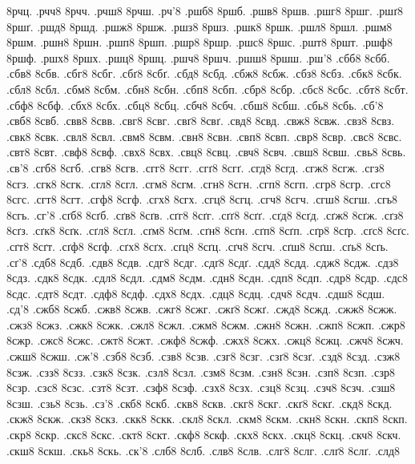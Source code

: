{8рчц.
.рчч8
8рчч.
.рчш8
8рчш.
.рч'8
.ршб8
8ршб.
.ршв8
8ршв.
.ршг8
8ршг.
.ршґ8
8ршґ.
.ршд8
8ршд.
.ршж8
8ршж.
.ршз8
8ршз.
.ршк8
8ршк.
.ршл8
8ршл.
.ршм8
8ршм.
.ршн8
8ршн.
.ршп8
8ршп.
.ршр8
8ршр.
.ршс8
8ршс.
.ршт8
8ршт.
.ршф8
8ршф.
.ршх8
8ршх.
.ршц8
8ршц.
.ршч8
8ршч.
.ршш8
8ршш.
.рш'8
.сбб8
8сбб.
.сбв8
8сбв.
.сбг8
8сбг.
.сбґ8
8сбґ.
.сбд8
8сбд.
.сбж8
8сбж.
.сбз8
8сбз.
.сбк8
8сбк.
.сбл8
8сбл.
.сбм8
8сбм.
.сбн8
8сбн.
.сбп8
8сбп.
.сбр8
8сбр.
.сбс8
8сбс.
.сбт8
8сбт.
.сбф8
8сбф.
.сбх8
8сбх.
.сбц8
8сбц.
.сбч8
8сбч.
.сбш8
8сбш.
.сбь8
8сбь.
.сб'8
.свб8
8свб.
.свв8
8свв.
.свг8
8свг.
.свґ8
8свґ.
.свд8
8свд.
.свж8
8свж.
.свз8
8свз.
.свк8
8свк.
.свл8
8свл.
.свм8
8свм.
.свн8
8свн.
.свп8
8свп.
.свр8
8свр.
.свс8
8свс.
.свт8
8свт.
.свф8
8свф.
.свх8
8свх.
.свц8
8свц.
.свч8
8свч.
.свш8
8свш.
.свь8
8свь.
.св'8
.сгб8
8сгб.
.сгв8
8сгв.
.сгг8
8сгг.
.сгґ8
8сгґ.
.сгд8
8сгд.
.сгж8
8сгж.
.сгз8
8сгз.
.сгк8
8сгк.
.сгл8
8сгл.
.сгм8
8сгм.
.сгн8
8сгн.
.сгп8
8сгп.
.сгр8
8сгр.
.сгс8
8сгс.
.сгт8
8сгт.
.сгф8
8сгф.
.сгх8
8сгх.
.сгц8
8сгц.
.сгч8
8сгч.
.сгш8
8сгш.
.сгь8
8сгь.
.сг'8
.сґб8
8сґб.
.сґв8
8сґв.
.сґг8
8сґг.
.сґґ8
8сґґ.
.сґд8
8сґд.
.сґж8
8сґж.
.сґз8
8сґз.
.сґк8
8сґк.
.сґл8
8сґл.
.сґм8
8сґм.
.сґн8
8сґн.
.сґп8
8сґп.
.сґр8
8сґр.
.сґс8
8сґс.
.сґт8
8сґт.
.сґф8
8сґф.
.сґх8
8сґх.
.сґц8
8сґц.
.сґч8
8сґч.
.сґш8
8сґш.
.сґь8
8сґь.
.сґ'8
.сдб8
8сдб.
.сдв8
8сдв.
.сдг8
8сдг.
.сдґ8
8сдґ.
.сдд8
8сдд.
.сдж8
8сдж.
.сдз8
8сдз.
.сдк8
8сдк.
.сдл8
8сдл.
.сдм8
8сдм.
.сдн8
8сдн.
.сдп8
8сдп.
.сдр8
8сдр.
.сдс8
8сдс.
.сдт8
8сдт.
.сдф8
8сдф.
.сдх8
8сдх.
.сдц8
8сдц.
.сдч8
8сдч.
.сдш8
8сдш.
.сд'8
.сжб8
8сжб.
.сжв8
8сжв.
.сжг8
8сжг.
.сжґ8
8сжґ.
.сжд8
8сжд.
.сжж8
8сжж.
.сжз8
8сжз.
.сжк8
8сжк.
.сжл8
8сжл.
.сжм8
8сжм.
.сжн8
8сжн.
.сжп8
8сжп.
.сжр8
8сжр.
.сжс8
8сжс.
.сжт8
8сжт.
.сжф8
8сжф.
.сжх8
8сжх.
.сжц8
8сжц.
.сжч8
8сжч.
.сжш8
8сжш.
.сж'8
.сзб8
8сзб.
.сзв8
8сзв.
.сзг8
8сзг.
.сзґ8
8сзґ.
.сзд8
8сзд.
.сзж8
8сзж.
.сзз8
8сзз.
.сзк8
8сзк.
.сзл8
8сзл.
.сзм8
8сзм.
.сзн8
8сзн.
.сзп8
8сзп.
.сзр8
8сзр.
.сзс8
8сзс.
.сзт8
8сзт.
.сзф8
8сзф.
.сзх8
8сзх.
.сзц8
8сзц.
.сзч8
8сзч.
.сзш8
8сзш.
.сзь8
8сзь.
.сз'8
.скб8
8скб.
.скв8
8скв.
.скг8
8скг.
.скґ8
8скґ.
.скд8
8скд.
.скж8
8скж.
.скз8
8скз.
.скк8
8скк.
.скл8
8скл.
.скм8
8скм.
.скн8
8скн.
.скп8
8скп.
.скр8
8скр.
.скс8
8скс.
.скт8
8скт.
.скф8
8скф.
.скх8
8скх.
.скц8
8скц.
.скч8
8скч.
.скш8
8скш.
.скь8
8скь.
.ск'8
.слб8
8слб.
.слв8
8слв.
.слг8
8слг.
.слґ8
8слґ.
.слд8
}

